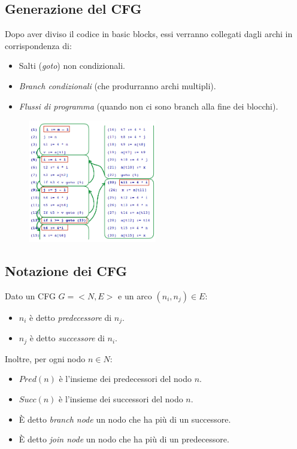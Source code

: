\documentclass[a4paper,oneside,titlepage]{book}
\begin{document}
\subsection{Generazione del CFG}
Dopo aver diviso il codice in basic blocks, essi verranno collegati dagli archi in corrispondenza di:
\begin{itemize}
	\item Salti (\textit{goto}) non condizionali.
	\item \textit{Branch condizionali} (che produrranno archi multipli).
	\item \textit{Flussi di programma} (quando non ci sono branch alla fine dei blocchi).
\end{itemize}
\begin{figure}[htp]
	\centering
	\includegraphics[width=0.5\textwidth]{cfgEx.png}
\end{figure}

\subsection{Notazione dei CFG}
Dato un CFG $G = <N,E>$ e un arco $(n_i, n_j) \in E$:
\begin{itemize}
	\item $n_i$ è detto \textit{predecessore} di $n_j$.
	\item $n_j$ è detto \textit{successore} di $n_i$.
\end{itemize}	
Inoltre, per ogni nodo $n\in N$:
\begin{itemize}
	\item $Pred(n)$ è l'insieme dei predecessori del nodo $n$.
	\item $Succ(n)$ è l'insieme dei successori del nodo $n$.
	\item \`{E} detto \textit{branch node} un nodo che ha più di un successore.
	\item \`{E} detto \textit{join node} un nodo che ha più di un predecessore.
\end{itemize}
\end{document}
